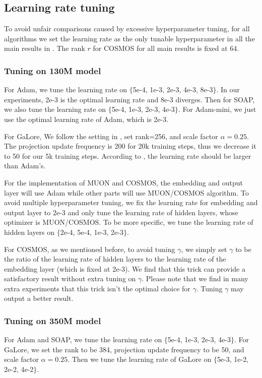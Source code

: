 \subsection{Learning rate tuning}

To avoid unfair comparisons caused by excessive hyperparameter tuning, for all algorithms we set the learning rate as the only tunable hyperparameter in all the main results in . The rank $r$ for COSMOS for all main results is fixed at 64.

\subsubsection{Tuning on 130M model}
\label{130M_tuning}

For Adam, we tune the learning rate on $\{$5e-4, 1e-3, 2e-3, 4e-3, 8e-3$\}$. In our experiments, 2e-3 is the optimal learning rate and 8e-3 diverges. Then for SOAP, we also tune the learning rate on $\{$5e-4, 1e-3, 2e-3, 4e-3$\}$. For Adam-mini, we just use the optimal learning rate of Adam, which is 2e-3.

For GaLore, We follow the setting in \citet{zhao2024galore}, set rank=256, and scale factor $\alpha = 0.25$. The projection update frequency is 200 for 20k training steps, thus we decrease it to 50 for our 5k training steps. According to \citet{zhao2024galore}, the learning rate should be larger than Adam's. 

For the implementation of MUON and COSMOS, the embedding and output layer will use Adam while other parts will use MUON/COSMOS algorithm. To avoid multiple hyperparameter tuning, we fix the learning rate for embedding and output layer to 2e-3 and only tune the learning rate of hidden layers, whose optimizer is MUON/COSMOS. To be more specific, we tune the learning rate of hidden layers on $\{$2e-4, 5e-4, 1e-3, 2e-3$\}$.

For COSMOS, as we mentioned before, to avoid tuning $\gamma$, we simply set $\gamma$ to be the ratio of the learning rate of hidden layers to the learning rate of the embedding layer (which is fixed at 2e-3). We find that this trick can provide a satisfactory result without extra tuning on $\gamma$. Please note that we find in many extra experiments that this trick isn't the optimal choice for $\gamma$. Tuning $\gamma$ may output a better result.

\subsubsection{Tuning on 350M model}\label{sec:config-350m}
For Adam and SOAP, we tune the learning rate on $\{$5e-4, 1e-3, 2e-3, 4e-3$\}$. For GaLore, we set the rank to be 384, projection update frequency to be 50, and scale factor $\alpha = 0.25$. Then we tune the learning rate of GaLore on $\{$5e-3, 1e-2, 2e-2, 4e-2$\}$. 

